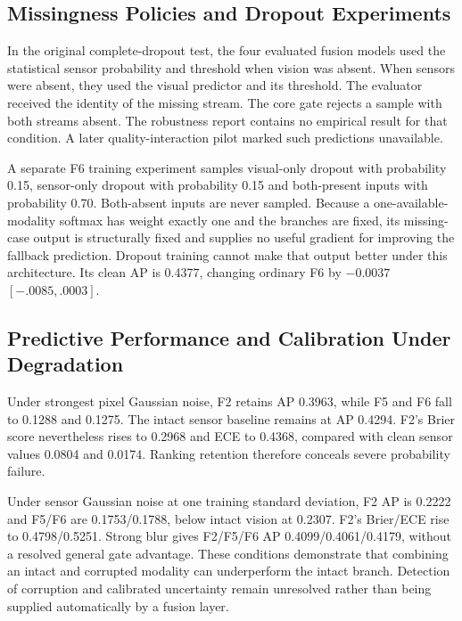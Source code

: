 \subsection{Missingness Policies and Dropout Experiments}
In the original complete-dropout test, the four evaluated fusion models used the statistical sensor probability and threshold when vision was absent. When sensors were absent, they used the visual predictor and its threshold. The evaluator received the identity of the missing stream. The core gate rejects a sample with both streams absent. The robustness report contains no empirical result for that condition. A later quality-interaction pilot marked such predictions unavailable.

A separate F6 training experiment samples visual-only dropout with probability 0.15, sensor-only dropout with probability 0.15 and both-present inputs with probability 0.70. Both-absent inputs are never sampled. Because a one-available-modality softmax has weight exactly one and the branches are fixed, its missing-case output is structurally fixed and supplies no useful gradient for improving the fallback prediction. Dropout training cannot make that output better under this architecture. Its clean AP is 0.4377, changing ordinary F6 by $-0.0037$ $[-.0085,.0003]$.

\subsection{Predictive Performance and Calibration Under Degradation}
Under strongest pixel Gaussian noise, F2 retains AP 0.3963, while F5 and F6 fall to 0.1288 and 0.1275. The intact sensor baseline remains at AP 0.4294. F2's Brier score nevertheless rises to 0.2968 and ECE to 0.4368, compared with clean sensor values 0.0804 and 0.0174. Ranking retention therefore conceals severe probability failure.

Under sensor Gaussian noise at one training standard deviation, F2 AP is 0.2222 and F5/F6 are 0.1753/0.1788, below intact vision at 0.2307. F2's Brier/ECE rise to 0.4798/0.5251. Strong blur gives F2/F5/F6 AP 0.4099/0.4061/0.4179, without a resolved general gate advantage. These conditions demonstrate that combining an intact and corrupted modality can underperform the intact branch. Detection of corruption and calibrated uncertainty remain unresolved rather than being supplied automatically by a fusion layer.

